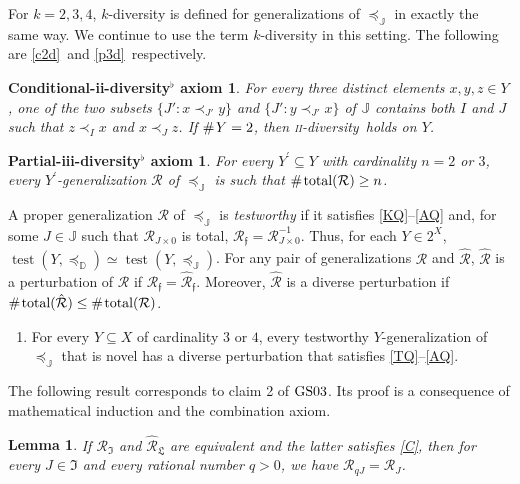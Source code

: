 \documentclass[ecta,nameyear,draft]{econsocart}
\newcommand{\test}{\operatorname{test}}
\newcommand{\countof}{\mathbin{\#}\hskip1pt}
\newcommand{\mc}{\mathcal}
\newcommand{\novel}{\mathfrak f}
\newcommand{\preceqb}{\mathbin{\preceq}}
\newcommand{\ext}{\mathrel{\mc R}}
\newcommand{\extb}{\mathbin{\mc R}}
\newcommand{\hext}{\mathrel{\hat{\mathrel{\mathcal R}}}}
\newcommand{\hextb}{\mathbin{\hat{\mathbin{\mathcal R}}}}
\newcommand{\total}{\textup{total}}
\newcommand{\mbbd}{{\mathds D}}
\newcommand{\mbbipp}{{\mathfrak L}}
\newcommand{\mbbj}{\mathds J}
\newcommand{\mbbjpp}{\mathfrak{I}}
\newcommand{\twodiv}{\textsc{ii}-\textup{diversity}}
\newcommand{\gsii}{$\textup{GS03}$}
\theoremstyle{plain}
\newtheorem{lemma}{Lemma}[theorem]
\newtheorem*{condtwodivq*}{Conditional-ii-diversity$^\flat$ axiom}
\newtheorem*{parthreedivq*}{Partial-iii-diversity$^\flat$ axiom}
\theoremstyle{remark}
\begin{document}
\begin{appendix}
  For $k = 2, 3, 4$, $k$-diversity is defined for generalizations of
  $\preceq_{\mbbj}$ in exactly the same way. We continue to use the term
  $k$-diversity in this setting.  The following are \ref{c2d}\ and
  \ref{p3d}\ respectively.
  \begin{condtwodivq*}
    \label{c2dQ} For every three distinct elements $x , y , z \in Y$, one
      of the two subsets $\{J': x \prec_{J'} y \}$ and $\{J': y \prec_{J'} x\}$
      of $\mbbj$ contains both $I$ and $J$ such that $z \prec _{I} x$ and $x
      \prec _{J} z$. If $\countof Y = 2$, then \twodiv\ holds on $Y$.
  \end{condtwodivq*}
  \begin{parthreedivq*}
    \label{p3dQ} For every $Y^{\prime} \subseteq Y$ with cardinality $n =
      2$ or $3$, every $Y^{\prime}$-generalization $\ext$ of $\preceq
      _{\mbbj}$ is such that $\countof{\total(\ext)} \geq n$.
  \end{parthreedivq*}

  A proper generalization $\ext$ of $\preceqb _{\mbbj}$ is \emph{testworthy}
  if it satisfies \ref{KQ}--\ref{AQ} and, for some $J\in \mbbj$ such that
  $\ext_{J\times 0}$ is total, $\extb_{\novel} = \extb_{J\times 0}^{-1}$. Thus,
  for each $Y \in 2^{X}$, $\test ( Y , \preceqb _{\mbbd} ) \simeq \test ( Y ,
  \preceqb _{\mbbj })$. For any pair of generalizations $\ext$ and $\hext$,
  $\hext$ is a perturbation of $\ext$ if $\extb_{\novel} = \hextb_{\novel}$.
  Moreover, $\hext$ is a {{diverse}} perturbation if $\countof \total (\hext)
  \leq \countof \total (\ext)$.
  \begin{enumerate}[label=\textsc{iv}-\textup{S}$^{\flat}$]
    \item\label{PQ} For every $Y \subseteq X$ of cardinality $3$ or $4$, every
      testworthy $Y$-generalization of $\preceqb _{\mbbj}$ that is novel has
      a {{diverse}} perturbation that satisfies \ref{TQ}–\ref{AQ}.
  \end{enumerate}

  The following result corresponds to claim 2 of \gsii. Its proof is a
  consequence of mathematical induction and the combination axiom.
  \vskip-15pt
  \begin{lemma}\label{lem-coneQ} If $\ext _ \mbbjpp$ and $\hext _ \mbbipp$ are
    equivalent and the latter satisfies \ref{C}, then for every $J \in \mbbjpp$
    and every rational number $q >0$, we have $\extb _{q J}  =  \extb _{J}$.
  \end{lemma}


\end{appendix}
\end{document}
